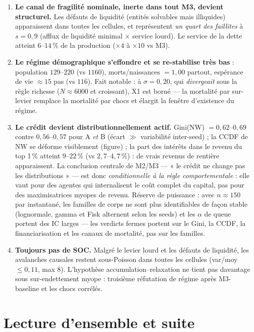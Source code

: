 \documentclass[11pt,a4paper]{article}
\newcommand{\NW}{\mathrm{NW}}
\begin{document}
\begin{enumerate}[leftmargin=1.6em, itemsep=3pt]
\item \textbf{Le canal de fragilité nominale, inerte dans tout M3, devient
  structurel.} Les défauts de liquidité (entités solvables mais illiquides)
  apparaissent dans toutes les cellules, et représentent \emph{un quart des
  faillites} à $s = 0{,}9$ (afflux de liquidité minimal $\times$ service
  lourd). Le service de la dette atteint $6$--$14\,\%$ de la production
  ($\times 4$ à $\times 10$ vs M3).
\item \textbf{Le régime démographique s'effondre et se re-stabilise très
  bas} : population $129$--$220$ (vs $1160$), morts/naissances $= 1{,}00$
  partout, espérance de vie $\approx 15$ pas (vs $116$). Fait notable : à
  $\sigma = 0{,}20$, qui \emph{divergeait} sous la règle richesse
  ($N \approx 6000$ et croissant), X1 est borné — la mortalité par
  sur-levier remplace la mortalité par chocs et élargit la fenêtre
  d'existence du régime.
\item \textbf{Le crédit devient distributionnellement actif.} Gini($\NW$)
  $= 0{,}62$--$0{,}69$ contre $0{,}56$--$0{,}57$ pour A \emph{et} B
  (écart $\gg$ variabilité inter-seed) ; la CCDF de $\NW$ se déforme
  visiblement (figure) ; la part des intérêts dans le revenu du top 1\,\%
  atteint $9$--$22\,\%$ (vs $2{,}7$--$4{,}7\,\%$) : de vrais revenus de
  rentière apparaissent. La conclusion centrale de M2/M3 — « le crédit ne
  change pas les distributions » — est donc \emph{conditionnelle à la règle
  comportementale} : elle vaut pour des agentes qui internalisent le coût
  complet du capital, pas pour des maximisatrices myopes de revenu.
  Réserve de puissance : avec $n \approx 150$ par instantané, les familles
  de corps ne sont plus identifiables de façon stable (lognormale, gamma et
  Fisk alternent selon les seeds) et les $\alpha$ de queue portent des IC
  larges — les verdicts fermes portent sur le Gini, la CCDF, la
  financiarisation et les canaux de mortalité, pas sur les familles.
\item \textbf{Toujours pas de SOC.} Malgré le levier lourd et les défauts
  de liquidité, les avalanches causales restent sous-Poisson dans toutes
  les cellules (var/moy $\le 0{,}11$, max $8$). L'hypothèse
  accumulation--relaxation ne tient pas davantage sous sur-endettement
  myope : troisième réfutation de régime après M3-baseline et les chocs
  corrélés.
\end{enumerate}

\section{Lecture d'ensemble et suite}
\end{document}
